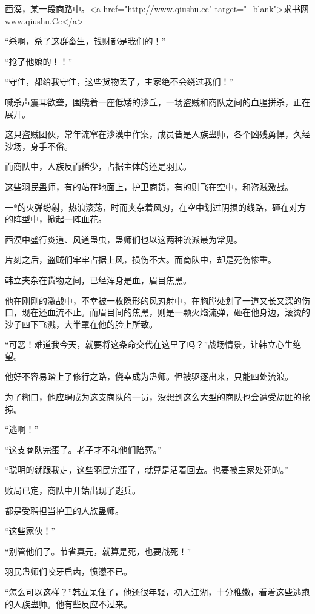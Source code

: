 
\begin{this_body}

西漠，某一段商路中。<a href="http://www.qiushu.cc" target="\_blank">求书网www.qiushu.Cc</a>

“杀啊，杀了这群畜生，钱财都是我们的！”

“抢了他娘的！！”

“守住，都给我守住，这些货物丢了，主家绝不会绕过我们！”

喊杀声震耳欲聋，围绕着一座低矮的沙丘，一场盗贼和商队之间的血腥拼杀，正在展开。

这只盗贼团伙，常年流窜在沙漠中作案，成员皆是人族蛊师，各个凶残勇悍，久经沙场，身手不俗。

而商队中，人族反而稀少，占据主体的还是羽民。

这些羽民蛊师，有的站在地面上，护卫商货，有的则飞在空中，和盗贼激战。

一*的火弹纷射，热浪滚荡，时而夹杂着风刃，在空中划过阴损的线路，砸在对方的阵型中，掀起一阵血花。

西漠中盛行炎道、风道蛊虫，蛊师们也以这两种流派最为常见。

片刻之后，盗贼们牢牢占据上风，损伤不大。而商队中，却是死伤惨重。

韩立夹杂在货物之间，已经浑身是血，眉目焦黑。

他在刚刚的激战中，不幸被一枚隐形的风刃射中，在胸膛处划了一道又长又深的伤口，现在还血流不止。而眉目间的焦黑，则是一颗火焰流弹，砸在他身边，滚烫的沙子四下飞溅，大半罩在他的脸上所致。

“可恶！难道我今天，就要将这条命交代在这里了吗？”战场情景，让韩立心生绝望。

他好不容易踏上了修行之路，侥幸成为蛊师。但被驱逐出来，只能四处流浪。

为了糊口，他应聘成为这支商队的一员，没想到这么大型的商队也会遭受劫匪的抢掠。

“逃啊！”

“这支商队完蛋了。老子才不和他们陪葬。”

“聪明的就跟我走，这些羽民完蛋了，就算是活着回去。也要被主家处死的。”

败局已定，商队中开始出现了逃兵。

都是受聘担当护卫的人族蛊师。

“这些家伙！”

“别管他们了。节省真元，就算是死，也要战死！”

羽民蛊师们咬牙启齿，愤懑不已。

“怎么可以这样？”韩立呆住了，他还很年轻，初入江湖，十分稚嫩，看着这些逃跑的人族蛊师。他有些反应不过来。


\end{this_body}
